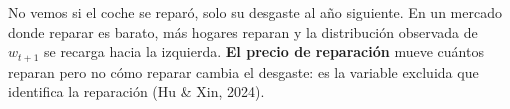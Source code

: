 \documentclass[border=0pt]{standalone}
\begin{document}
\begin{minipage}{26.783cm}\fontsize{23}{28.5}\selectfont\raggedright 
No vemos si el coche se reparó, solo su desgaste al año siguiente. En un mercado
donde reparar es barato, más hogares reparan y la distribución observada de
$w_{t+1}$ se recarga hacia la izquierda. \textbf{El precio de reparación} mueve
cuántos reparan pero no cómo reparar cambia el desgaste: es la variable excluida que
identifica la reparación (Hu \& Xin, 2024).
\end{minipage}
\end{document}
